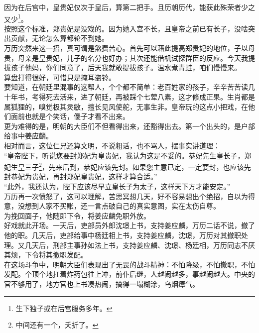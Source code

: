 \begin{multicols}{\theparacolNo}
因为在后宫中，皇贵妃仅次于皇后，算第二把手。且历朝历代，能获此殊荣者少之又少\footnote{生下独子或在后宫服务多年。}。\\

按照这个标准，郑贵妃是没戏的。因为她入宫不长，且皇帝之前已有长子，没啥突出贡献，无论怎么算都轮不到她。\\

万历突然来这一招，真可谓是煞费苦心。首先可以藉此提高郑贵妃的地位，子以母贵，母亲是皇贵妃，儿子的名分也好办；其次还能借机试探群臣的反应。今天我提拔孩子他妈，你们同意了，后天我就敢提拔孩子。温水煮青蛙，咱们慢慢来。\\

算盘打得很好，可惜只是掩耳盗铃。\\

要知道，在朝廷里混事的这帮人，个个都不简单：老百姓家的孩子，辛辛苦苦读几十年书，考得死去活来，进了朝廷，再被踩个七荤八素，这才修成正果。生肖都是属狐狸的，嗅觉极其灵敏，擅长见风使舵，无事生非。皇帝玩的这点小把戏，在他们面前也就是个笑话，傻子才看不出来。\\

更为难得的是，明朝的大臣们不但看得出来，还豁得出去。第一个出头的，是户部给事中姜应麟。\\

相对而言，这位仁兄还算文明，不说粗话，也不骂人，摆事实讲道理：\\

“皇帝陛下，听说您要封郑妃为皇贵妃，我认为这是不妥的。恭妃先生皇长子，郑妃生皇三子\footnote{中间还有一个，夭折了。}，先来后到，恭妃应该先封。如果您主意已定，一定要封，也应该先封恭妃为贵妃，再封郑妃皇贵妃，这样才算合适。”\\

“此外，我还认为，陛下应该尽早立皇长子为太子，这样天下方才能安定。”\\

万历再一次愤怒了，这可以理解，苦思冥想几天，好不容易想出个绝招，自以为得意，没想到人家不买账，还一言点破自己的真实意图，实在太伤自尊。\\

为挽回面子，他随即下令，将姜应麟免职外放。\\

好戏就此开场。一天后，吏部员外郎沈璟上书，支持姜应麟，万历二话不说，撤了他的职。几天后，吏部给事中杨廷相上书，支持姜应麟，沈璟，万历对其撤职处理。又几天后，刑部主事孙如法上书，支持姜应麟、沈璟、杨廷相，万历同志不厌其烦，下令将其撤职发配。\\

在这场斗争中，明朝大臣们表现出了无畏的战斗精神：不怕降级，不怕撤职，不怕发配。个顶个地扛着炸药包往上冲，前仆后继，人越闹越多，事越闹越大。中央的官不够用了，地方官也上书凑热闹，搞得一塌糊涂，乌烟瘴气。\\


\end{multicols}
